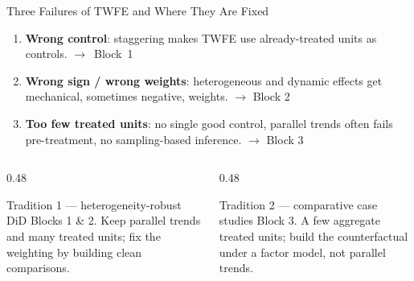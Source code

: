 \documentclass[main.tex]{subfiles}
\begin{document}
\begin{frame}{Three Failures of TWFE and Where They Are Fixed}

  \begin{enumerate}
    \setlength{\itemsep}{8pt}
    \item \textbf{Wrong control}: staggering makes TWFE use already-treated
      units as controls. \hfill\null\nobreak\hfill \mbox{\alert{$\rightarrow$ Block~1}}
    \item \textbf{Wrong sign / wrong weights}: heterogeneous and dynamic effects
      get mechanical, sometimes negative, weights. \hfill \alert{$\rightarrow$ Block 2}
    \item \textbf{Too few treated units}: no single good control, parallel
      trends often fails pre-treatment, no sampling-based inference. \hfill \alert{$\rightarrow$ Block 3}
  \end{enumerate}

  \medskip
  \begin{columns}[T]
    \begin{column}{0.48\textwidth}
      \begin{block}{Tradition 1 --- heterogeneity-robust DiD}
        Blocks 1 \& 2. Keep parallel trends and many treated units;
        \alert{fix the weighting} by building clean comparisons.
      \end{block}
    \end{column}
    \begin{column}{0.48\textwidth}
      \begin{alertblock}{Tradition 2 --- comparative case studies}
        Block 3. A few aggregate treated units;
        \alert{build the counterfactual} under a factor model, not parallel trends.
      \end{alertblock}
    \end{column}
  \end{columns}

\end{frame}
\end{document}
